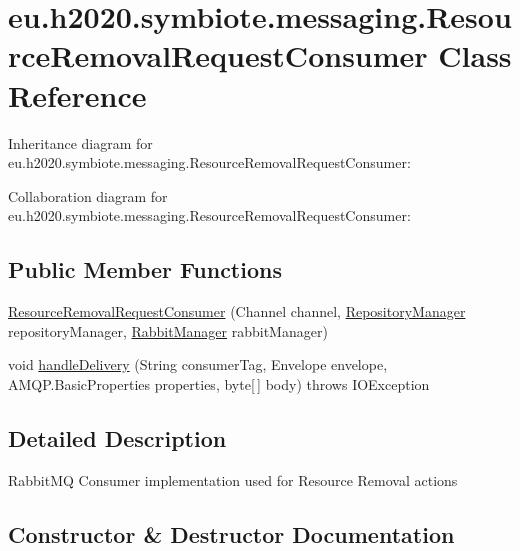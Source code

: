 \hypertarget{classeu_1_1h2020_1_1symbiote_1_1messaging_1_1ResourceRemovalRequestConsumer}{}\section{eu.\+h2020.\+symbiote.\+messaging.\+Resource\+Removal\+Request\+Consumer Class Reference}
\label{classeu_1_1h2020_1_1symbiote_1_1messaging_1_1ResourceRemovalRequestConsumer}


Inheritance diagram for eu.\+h2020.\+symbiote.\+messaging.\+Resource\+Removal\+Request\+Consumer\+:


Collaboration diagram for eu.\+h2020.\+symbiote.\+messaging.\+Resource\+Removal\+Request\+Consumer\+:
\subsection*{Public Member Functions}
\begin{DoxyCompactItemize}
\item 
\hyperlink{classeu_1_1h2020_1_1symbiote_1_1messaging_1_1ResourceRemovalRequestConsumer_aba5553aba270fe213d42a950e5c3ccd6}{Resource\+Removal\+Request\+Consumer} (Channel channel, \hyperlink{classeu_1_1h2020_1_1symbiote_1_1repository_1_1RepositoryManager}{Repository\+Manager} repository\+Manager, \hyperlink{classeu_1_1h2020_1_1symbiote_1_1messaging_1_1RabbitManager}{Rabbit\+Manager} rabbit\+Manager)
\item 
void \hyperlink{classeu_1_1h2020_1_1symbiote_1_1messaging_1_1ResourceRemovalRequestConsumer_acddf45d794a218a11e496d11e47dd01c}{handle\+Delivery} (String consumer\+Tag, Envelope envelope, A\+M\+Q\+P.\+Basic\+Properties properties, byte\mbox{[}$\,$\mbox{]} body)  throws I\+O\+Exception 
\end{DoxyCompactItemize}


\subsection{Detailed Description}
Rabbit\+MQ Consumer implementation used for Resource Removal actions 

\subsection{Constructor \& Destructor Documentation}
